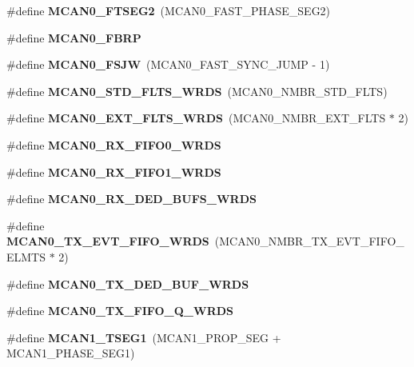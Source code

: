 \begin{DoxyCompactItemize}
\#define {\bfseries M\+C\+A\+N0\+\_\+\+F\+T\+S\+E\+G2}~(M\+C\+A\+N0\+\_\+\+F\+A\+S\+T\+\_\+\+P\+H\+A\+S\+E\+\_\+\+S\+E\+G2)
\item 
\#define {\bfseries M\+C\+A\+N0\+\_\+\+F\+B\+RP}
\item 
\mbox{\label{group__can__module_ga98e12cacc1250e99346ecec71d26eae3}} 
\#define {\bfseries M\+C\+A\+N0\+\_\+\+F\+S\+JW}~(M\+C\+A\+N0\+\_\+\+F\+A\+S\+T\+\_\+\+S\+Y\+N\+C\+\_\+\+J\+U\+MP -\/ 1)
\item 
\mbox{\label{group__can__module_ga21f9c5abc70cd53c4930533a0df80f73}} 
\#define {\bfseries M\+C\+A\+N0\+\_\+\+S\+T\+D\+\_\+\+F\+L\+T\+S\+\_\+\+W\+R\+DS}~(M\+C\+A\+N0\+\_\+\+N\+M\+B\+R\+\_\+\+S\+T\+D\+\_\+\+F\+L\+TS)
\item 
\mbox{\label{group__can__module_ga7a8c46b7b23043fab7946442e679f75e}} 
\#define {\bfseries M\+C\+A\+N0\+\_\+\+E\+X\+T\+\_\+\+F\+L\+T\+S\+\_\+\+W\+R\+DS}~(M\+C\+A\+N0\+\_\+\+N\+M\+B\+R\+\_\+\+E\+X\+T\+\_\+\+F\+L\+TS $\ast$ 2)
\item 
\#define {\bfseries M\+C\+A\+N0\+\_\+\+R\+X\+\_\+\+F\+I\+F\+O0\+\_\+\+W\+R\+DS}
\item 
\#define {\bfseries M\+C\+A\+N0\+\_\+\+R\+X\+\_\+\+F\+I\+F\+O1\+\_\+\+W\+R\+DS}
\item 
\#define {\bfseries M\+C\+A\+N0\+\_\+\+R\+X\+\_\+\+D\+E\+D\+\_\+\+B\+U\+F\+S\+\_\+\+W\+R\+DS}
\item 
\mbox{\label{group__can__module_ga6a807dc83a8cb49e93eceab3a9f7ac34}} 
\#define {\bfseries M\+C\+A\+N0\+\_\+\+T\+X\+\_\+\+E\+V\+T\+\_\+\+F\+I\+F\+O\+\_\+\+W\+R\+DS}~(M\+C\+A\+N0\+\_\+\+N\+M\+B\+R\+\_\+\+T\+X\+\_\+\+E\+V\+T\+\_\+\+F\+I\+F\+O\+\_\+\+E\+L\+M\+TS $\ast$ 2)
\item 
\#define {\bfseries M\+C\+A\+N0\+\_\+\+T\+X\+\_\+\+D\+E\+D\+\_\+\+B\+U\+F\+\_\+\+W\+R\+DS}
\item 
\#define {\bfseries M\+C\+A\+N0\+\_\+\+T\+X\+\_\+\+F\+I\+F\+O\+\_\+\+Q\+\_\+\+W\+R\+DS}
\item 
\mbox{\label{group__can__module_ga6a3c087e47c3bf28d2e5af6a4a3fdd6f}} 
\#define {\bfseries M\+C\+A\+N1\+\_\+\+T\+S\+E\+G1}~(M\+C\+A\+N1\+\_\+\+P\+R\+O\+P\+\_\+\+S\+EG + M\+C\+A\+N1\+\_\+\+P\+H\+A\+S\+E\+\_\+\+S\+E\+G1)
\item 

\end{DoxyCompactItemize}
